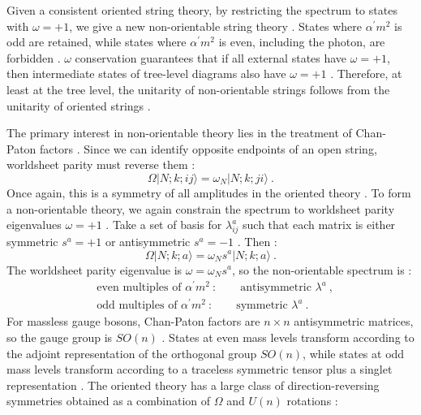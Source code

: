 Given a consistent oriented string theory, by restricting the spectrum to states with $\omega=+1$, we give a new non-orientable string theory . States where $\alpha^{\prime} m^{2}$ is odd are retained, while states where $\alpha^{\prime} m^{2}$ is even, including the photon, are forbidden . $\omega$ conservation guarantees that if all external states have $\omega=+1$, then intermediate states of tree-level diagrams also have $\omega=+1$ . Therefore, at least at the tree level, the unitarity of non-orientable strings follows from the unitarity of oriented strings .

The primary interest in non-orientable theory lies in the treatment of Chan-Paton factors . Since we can identify opposite endpoints of an open string, worldsheet parity must reverse them :
\begin{equation}
	\Omega|N ; k ; i j\rangle=\omega_{N}|N ; k ; j i\rangle \:. \label{6.5.22}
\end{equation}
Once again, this is a symmetry of all amplitudes in the oriented theory . To form a non-orientable theory, we again constrain the spectrum to worldsheet parity eigenvalues $\omega=+1$ . Take a set of basis for $\lambda_{i j}^{a}$ such that each matrix is either symmetric $s^{a}=+1$ or antisymmetric $s^{a}=-1$ . Then :
\begin{equation}
	\Omega|N ; k ; a\rangle=\omega_{N} s^{a}|N ; k ; a\rangle \:. \label{6.5.23}
\end{equation}
The worldsheet parity eigenvalue is $\omega=\omega_{N} s^{a}$, so the non-orientable spectrum is :
\begin{subequations} \label{6.5.24}
	\begin{align}
		&\text{even multiples of } \alpha^{\prime} m^{2} \:: \qquad   \text{antisymmetric } \lambda^{a}  \:, \label{6.5.24a} \\ 	
		&\text{odd multiples of } \alpha^{\prime} m^{2} \:: \qquad   \text{symmetric } \lambda^{a}  \:. \label{6.5.24b} 
	\end{align}			
\end{subequations}
For massless gauge bosons, Chan-Paton factors are $n \times n$ antisymmetric matrices, so the gauge group is $SO(n)$ . States at even mass levels transform according to the adjoint representation of the orthogonal group $SO(n)$, while states at odd mass levels transform according to a traceless symmetric tensor plus a singlet representation . The oriented theory has a large class of direction-reversing symmetries obtained as a combination of $\Omega$ and $U(n)$ rotations :
